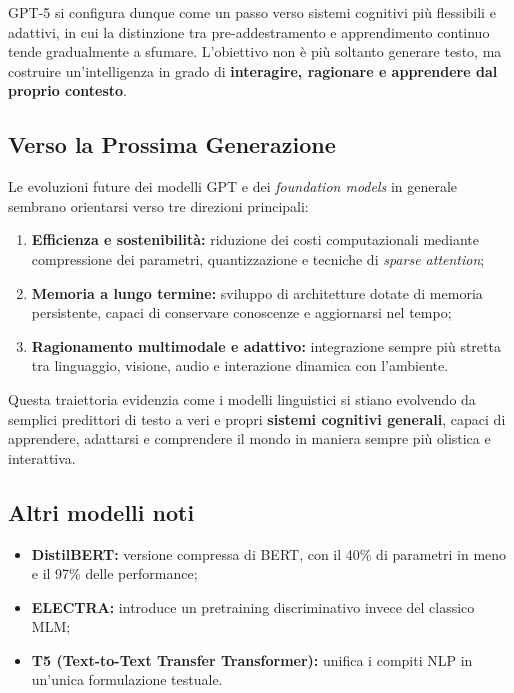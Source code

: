 GPT-5 si configura dunque come un passo verso sistemi cognitivi più flessibili e adattivi, in cui la distinzione tra pre-addestramento e apprendimento continuo tende gradualmente a sfumare. L’obiettivo non è più soltanto generare testo, ma costruire un’intelligenza in grado di \textbf{interagire, ragionare e apprendere dal proprio contesto}.

\subsection{Verso la Prossima Generazione}

Le evoluzioni future dei modelli GPT e dei \textit{foundation models} in generale sembrano orientarsi verso tre direzioni principali:
\begin{enumerate}
    \item \textbf{Efficienza e sostenibilità:} riduzione dei costi computazionali mediante compressione dei parametri, quantizzazione e tecniche di \textit{sparse attention};
    \item \textbf{Memoria a lungo termine:} sviluppo di architetture dotate di memoria persistente, capaci di conservare conoscenze e aggiornarsi nel tempo;
    \item \textbf{Ragionamento multimodale e adattivo:} integrazione sempre più stretta tra linguaggio, visione, audio e interazione dinamica con l’ambiente.
\end{enumerate}

Questa traiettoria evidenzia come i modelli linguistici si stiano evolvendo da semplici predittori di testo a veri e propri \textbf{sistemi cognitivi generali}, capaci di apprendere, adattarsi e comprendere il mondo in maniera sempre più olistica e interattiva.


\subsection{Altri modelli noti}

\begin{itemize}
    \item \textbf{DistilBERT:} versione compressa di BERT, con il 40\% di parametri in meno e il 97\% delle performance;
    \item \textbf{ELECTRA:} introduce un pretraining discriminativo invece del classico MLM;
    \item \textbf{T5 (Text-to-Text Transfer Transformer):} unifica i compiti NLP in un’unica formulazione testuale.
\end{itemize}

